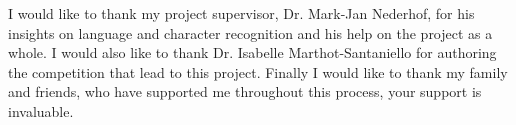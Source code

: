 \documentclass[
12pt, %
oneside, %
english, %
singlespacing, %
liststotoc, %
toctotoc, %
headsepline, %
]{MastersDoctoralThesis} %
\def\appendixinput#1{}
\begin{document}
%
%


\begin{acknowledgements}
	I would like to thank my project supervisor, Dr. Mark-Jan Nederhof, for his insights on language and character recognition and his help on the project as a whole. I would also like to thank Dr. Isabelle Marthot-Santaniello for authoring the competition that lead to this project. Finally I would like to thank my family and friends, who have supported me throughout this process, your support is invaluable.
\end{acknowledgements}


\tableofcontents %

\listoffigures %

\listoftables %


\appendixinput{abbreviations.tex}




\end{document}

